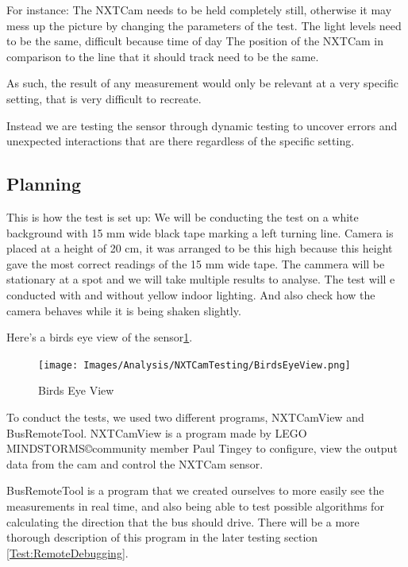 For instance:
The NXTCam needs to be held completely still, otherwise it may mess up the picture by changing the parameters of the test.
The light levels need to be the same, difficult because time of day
The position of the NXTCam in comparison to the line that it should track need to be the same.

As such, the result of any measurement would only be relevant at a very specific setting, that is very difficult to recreate. 

Instead we are testing the sensor through dynamic testing to uncover errors and unexpected interactions that are there regardless of the specific setting. 


\subsection{Planning}
This is how the test is set up:
We will be conducting the test on a white background with 15 mm wide black tape marking a left turning line. Camera is placed at a height of 20 cm, it was arranged to be this high because this height gave the most correct readings of the 15 mm wide tape. The cammera will be stationary at a spot and we will take multiple results to analyse. The test will e conducted with and without yellow indoor lighting. And also check how the camera behaves while it is being shaken slightly.

Here's a birds eye view of the sensor\ref{fig:BirdsEyeView}.
\begin{figure}[H]
    \centering
    \texttt{[image: Images/Analysis/NXTCamTesting/BirdsEyeView.png]}
    \caption{Birds Eye View}
    \label{fig:BirdsEyeView}
\end{figure}



To conduct the tests, we used two different programs, NXTCamView and BusRemoteTool. 
NXTCamView is a program made by LEGO MINDSTORMS\copyright community member Paul Tingey to configure, view the output data from the cam and control the NXTCam sensor. 

BusRemoteTool is a program that we created ourselves to more easily see the measurements in real time, and also being able to test possible algorithms for calculating the direction that the bus should drive. There will be a more thorough description of this program in the later testing section \ref{Test:RemoteDebugging}. 

